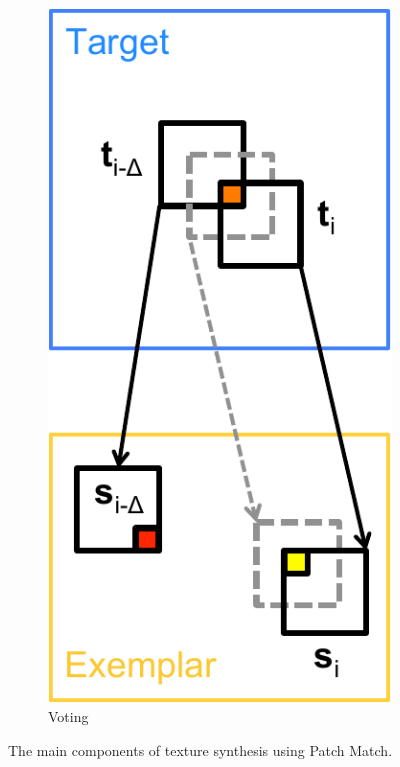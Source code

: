 \begin{figure}[ht]
	\begin{subfigure}[t]{0.155\textwidth}
		\includegraphics[width=\textwidth]{figures/voting_text}
		\caption{Voting}
	\end{subfigure}
   \caption{The main components of texture synthesis using Patch Match.}
\label{fig:texsynth_patchmatch}
\end{figure}

